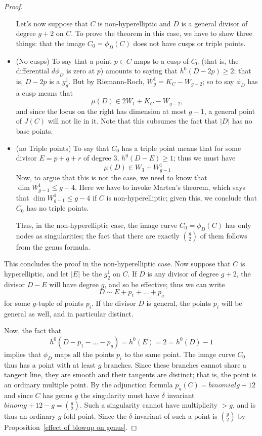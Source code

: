 \begin{proof}
\begin{itemize}
Let's now suppose that $C$ is non-hyperelliptic and $D$ is a general divisor of degree $g+2$ on $C$. To prove the theorem in this case, we have to show  three things: that the image $C_0 = \phi_D(C)$ does not have cusps or triple points.

\item (No cusps) To say that a point $p \in C$ maps to a cusp of $C_0$ (that is, the differential $d\phi_D$ is zero at $p$) amounts to saying that $h^0(D-2p) \geq 2$; that is, $D-2p$ is a $g^1_g$. But by Riemann-Roch, $W^1_g = K_C - W_{g-2}$; so to say $\phi_D$ has a cusp means that
$$
\mu(D) \in 2W_1 + K_C - W_{g-2},
$$
and since the locus on the right has dimension at most $g-1$, a general point of $J(C)$ will not lie in it. Note that this subsumes the fact that $|D|$ has no base points.

\item (no Triple points) To say that $C_0$ has a triple point means that for some divisor $E = p+q+r$ of degree 3, $h^0(D-E) \geq 1$; thus we must have 
$$
\mu(D) \in W_3 + W^1_{g-1}
$$
Now, to argue that this is not the case, we need to know that $\dim W^1_{g-1} \leq g-4$. Here we have to invoke Marten's theorem, which says that $\dim W^1_{g-1} \leq g-4$ if $C$ is non-hyperelliptic; given this, we conclude that $C_0$ has no triple points.


Thus, in the non-hyperelliptic case, the image curve $C_0 = \phi_D(C)$ has only nodes as singularities; the fact that there are exactly $\binom{g}{2}$ of them follows from the genus formula.
\end{itemize}

\noindent This concludes the proof in the non-hyperelliptic case. Now suppose that $C$ is hyperelliptic, and let $|E|$ be the  $g^1_2$ on $C$. If  $D$ is any divisor of degree $g+2$, the divisor $D - E$ will have degree $g$, and so be effective; thus we can write
$$
D \sim E + p_1 + \dots + p_g
$$
for some $g$-tuple of points $p_i$. If the divisor $D$ is general, the points $p_i$ will be general as well, and in particular distinct.

Now, the fact that
$$
h^0(D - p_1 - \dots - p_g) = h^0(E) = 2 = h^0(D) - 1
$$
implies that $\phi_D$ maps all the points $p_i$ to the same point. The image curve $C_0$ thus has a point with at least $g$ branches. Since these branches cannot share a tangent line,
they are smooth and their tangents are distinct; that is, the point is an ordinary multiple point. By the adjunction
formula $p_a(C) = binomial{g+1}{2}$ and since $C$ has genus $g$ the singularity must have $\delta$ invariant
$binom{g+1}{2} -g = \binom{g}{2}$. Such a singularity cannot have multiplicity $>g$, and is thus an ordinary $g$-fold point. Since the $\delta$-invariant of such a point is $\binom{g}{2}$ by Proposition~\ref{effect of blowup on genus}.
\end{proof}





